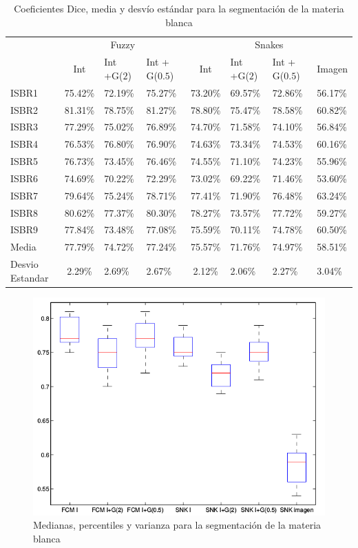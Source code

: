 \begin{table}[h]
	\centering
	\begin{tabular}{l|cll|clll}
		& \multicolumn{3}{c|}{Fuzzy} & \multicolumn{4}{c}{Snakes} \\ \cline{2-8} 
		& Int & Int +G($2$) & Int + G($0.5$) & Int & Int +G($2$) & Int + G($0.5$) & Imagen \\ \hline
		ISBR1 & 75.42\% & 72.19\% & 75.27\% & 73.20\% & 69.57\% & 72.86\% & 56.17\% \\
		ISBR2 & 81.31\% & 78.75\% & 81.27\% & 78.80\% & 75.47\% & 78.58\% & 60.82\% \\
		ISBR3 & 77.29\% & 75.02\% & 76.89\% & 74.70\% & 71.58\% & 74.10\% & 56.84\% \\
		ISBR4 & 76.53\% & 76.80\% & 76.90\% & 74.63\% & 73.34\% & 74.53\% & 60.16\% \\
		ISBR5 & 76.73\% & 73.45\% & 76.46\% & 74.55\% & 71.10\% & 74.23\% & 55.96\% \\
		ISBR6 & 74.69\% & 70.22\% & 72.29\% & 73.02\% & 69.22\% & 71.46\% & 53.60\% \\
		ISBR7 & 79.64\% & 75.24\% & 78.71\% & 77.41\% & 71.90\% & 76.48\% & 63.24\% \\
		ISBR8 & 80.62\% & 77.37\% & 80.30\% & 78.27\% & 73.57\% & 77.72\% & 59.27\% \\
		ISBR9 & 77.84\% & 73.48\% & 77.08\% & 75.59\% & 70.11\% & 74.78\% & 60.50\% \\ \hline
		Media & 77.79\% & 74.72\% & 77.24\% & 75.57\% & 71.76\% & 74.97\% & 58.51\% \\ \hline
		Desvio Estandar & 2.29\% & 2.69\% & 2.67\% & 2.12\% & 2.06\% & 2.27\% & 3.04\%
	\end{tabular}
	\caption{Coeficientes Dice, media y desvío estándar para la segmentación de la materia blanca}
	\label{table:resultados_blanca}
\end{table}

\begin{figure}[H]
	\centering
	\includegraphics[scale=0.5]{images/BoxPlotMB.png}
	\caption{Medianas, percentiles y varianza para la segmentación de la materia blanca}
	\label{fig:boxplotMB}
\end{figure}

